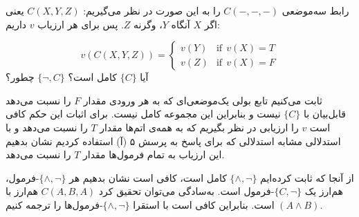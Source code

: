رابط سه‌موضعی $C(-,-,-)$ را به این صورت در نظر می‌گیریم: $C(X,Y,Z)$ یعنی اگر $X$ آنگاه $Y$، وگرنه $Z$. پس برای هر ارزیاب $v$ داریم:

$$
v(C(X,Y,Z))=
\begin{cases}
v(Y) & \text{if}~~v(X)=T\\
v(Z) & \text{if}~~v(X)=F
\end{cases}
$$
آیا $\{C\}$ کامل است؟ $\{\neg, C\}$ چطور؟
\begin{ans}
  ثابت می‌کنیم تابع بولی یک‌موضعی‌ای که به هر ورودی مقدار $F$ را نسبت می‌دهد قابل‌بیان با $\{C\}$ نیست و بنابراین این مجموعه کامل نیست. برای اثبات این حکم کافی است $v$ را ارزیابی در نظر بگیریم که به همه‌ی اتم‌ها مقدار $T$ را نسبت می‌دهد و با استدلالی مشابه استدلالی که برای پاسخ به پرسش ۵ (آ) استفاده کردیم نشان بدهیم این ارزیاب به تمام فرمول‌ها مقدار $T$ را نسبت می‌دهد.

  از آنجا که ثابت کرده‌ایم
  $\{\wedge,\neg\}$
  کامل است، کافی است نشان بدهیم هر $\{\wedge,\neg\}$-فرمول، هم‌ارز یک $\{C,\neg\}$-فرمول است. به‌سادگی می‌توان تحقیق کرد
  $C(A,B,A)$
  هم‌ارز با
  $(A\wedge B)$
  است. بنابراین کافی است با استقرا $\{\wedge,\neg\}$-فرمول‌ها را ترجمه کنیم.
\end{ans}